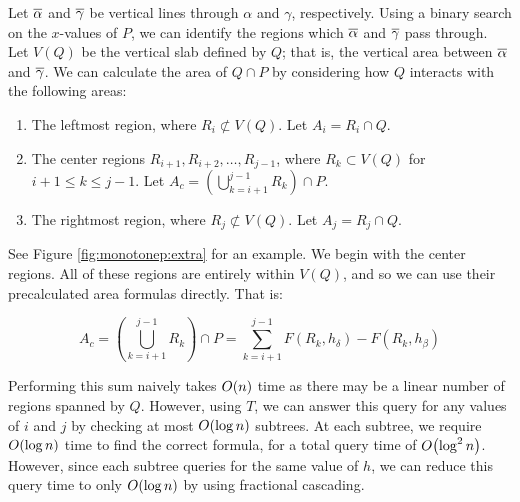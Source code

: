 Let $\overline{\alpha}$ and $\overline{\gamma}$ be vertical lines through $\alpha$ and $\gamma$, respectively.
Using a binary search on the $x$-values of $P$, we can identify the regions which $\overline{\alpha}$ and $\overline{\gamma}$ pass through.
Let $V(Q)$ be the vertical slab defined by $Q$; that is, the vertical area between $\overline{\alpha}$ and $\overline{\gamma}$.
We can calculate the area of $Q \cap P$ by considering how $Q$ interacts with the following areas:

\begin{enumerate}
 \item The leftmost region, where $R_i \not \subset V(Q)$. Let $A_i = R_i \cap Q$.
 \item The center regions $R_{i+1}, R_{i+2}, \ldots, R_{j-1}$, where  $R_k \subset V(Q)$ for $i + 1 \leq k \leq j -1$. Let $A_c = \left ( \bigcup_{k=i+1}^{j-1}{R_k} \right ) \cap P $.
 \item The rightmost region, where $R_j \not \subset V(Q)$. Let $A_j = R_j \cap Q$. 
\end{enumerate}

See Figure \ref{fig:monotonep:extra} for an example. We begin with the center regions. All of these regions are entirely within $V(Q)$, and so we can use their precalculated area formulas directly. That is:

\[
A_c
= \left ( \bigcup_{k=i+1}^{j-1}{R_k} \right ) \cap P 
= \sum_{k=i+1}^{j-1} F(R_k, h_\delta) - F(R_k, h_\beta)
\]

\noindent Performing this sum naively takes $O\!\left(n\right)$ time as there may be a linear number of regions spanned by $Q$.
However, using $T$, we can answer this query for any values of $i$ and $j$ by checking at most $O\!\left(\log{n}\right)$ subtrees. 
At each subtree, we require $O\!\left(\log{n}\right)$ time to find the correct formula, for a total query time of $O\!\left(\log^2{n}\right)$.
However, since each subtree queries for the same value of $h$, we can reduce this query time to only $O\!\left(\log{n}\right)$ by using fractional cascading.\cite{cg-fc-86, cg-fc2-86}

